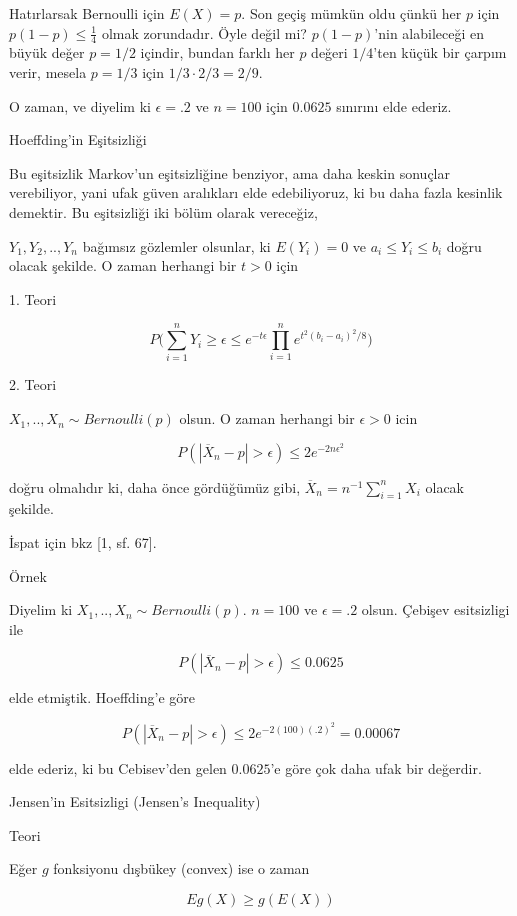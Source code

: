 \documentclass[12pt,fleqn]{article}\usepackage{../../common}
\begin{document}
Hatırlarsak Bernoulli için $E(X)=p$. Son geçiş mümkün oldu çünkü her $p$
için $p(1-p) \le \frac{1}{4}$ olmak zorundadır. Öyle değil mi? $p(1-p)$'nin
alabileceği en büyük değer $p=1/2$ içindir, bundan farklı her $p$ değeri
$1/4$'ten küçük bir çarpım verir, mesela $p=1/3$ için
$1/3 \cdot 2/3 = 2/9$.

O zaman, ve diyelim ki $\epsilon = .2$ ve $n=100$ için $0.0625$ sınırını
elde ederiz. 

Hoeffding'in Eşitsizliği

Bu eşitsizlik Markov'un eşitsizliğine benziyor, ama daha keskin sonuçlar
verebiliyor, yani ufak güven aralıkları elde edebiliyoruz, ki bu daha fazla
kesinlik demektir. Bu eşitsizliği iki bölüm olarak vereceğiz, 

$Y_1,Y_2,..,Y_n$ bağımsız gözlemler olsunlar, ki $E(Y_i)=0$ ve
$a_i \le Y_i \le b_i$ doğru olacak şekilde. O zaman herhangi bir $t>0$ için 

1. Teori

$$ 
P \bigg( 
\sum _{i=1}^{n} Y_i \ge \epsilon \le e^{-t\epsilon} 
\prod _{i=1}^{n} e^{{t^2}(b_i-a_i)^2 / 8}
\bigg)
$$

2. Teori

$X_1,..,X_n \sim Bernoulli(p)$ olsun. O zaman herhangi bir $\epsilon > 0$ icin

$$ P(|\overline{X}_n -p| > \epsilon ) \le 2e^{-2n\epsilon^2}$$

doğru olmalıdır ki, daha önce gördüğümüz gibi,
$\overline{X}_n = n^{-1}\sum _{i=1}^{n} X_i$ olacak şekilde. 

İspat için bkz [1, sf. 67]. 

Örnek

Diyelim ki $X_1,..,X_n \sim Bernoulli(p)$. $n=100$ ve $\epsilon=.2$
olsun. Çebişev esitsizligi ile 

$$ P(|\overline{X}_n - p| > \epsilon ) \le 0.0625 $$

elde etmiştik. Hoeffding'e göre

$$ 
P(|\overline{X}_n - p| > \epsilon ) \le 2e^{-2 (100)(.2)^2} = 0.00067
$$

elde ederiz, ki bu Cebisev'den gelen $0.0625$'e göre çok daha ufak bir
değerdir.


Jensen'in Esitsizligi (Jensen's Inequality)

Teori

Eğer $g$ fonksiyonu dışbükey (convex) ise o zaman

$$
E g(X) \ge g(E(X)) 
$$
\end{document}

